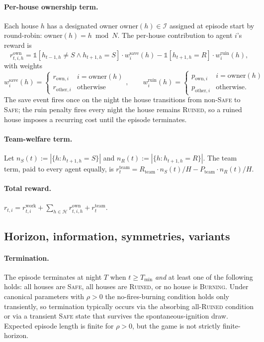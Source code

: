\documentclass{anvil-paper}
\begin{document}
\paragraph{Per-house ownership term.}
Each house $h$ has a designated owner $\mathrm{owner}(h)\in\mathcal{I}$
assigned at episode start by round-robin: $\mathrm{owner}(h)=h\bmod N$.
The per-house contribution to agent $i$'s reward is
\[
  r_{t,i,h}^{\text{own}} = \mathbb{1}[h_{t-1,h}\neq S\land h_{t+1,h}=S]
                           \cdot w^{\text{save}}_i(h)
                         - \mathbb{1}[h_{t+1,h}=R]\cdot w^{\text{ruin}}_i(h),
\]
with weights
\[
  w^{\text{save}}_i(h) = \begin{cases}
    r_{\text{own},i} & i=\mathrm{owner}(h) \\
    r_{\text{other},i} & \text{otherwise}
  \end{cases},\qquad
  w^{\text{ruin}}_i(h) = \begin{cases}
    p_{\text{own},i} & i=\mathrm{owner}(h) \\
    p_{\text{other},i} & \text{otherwise.}
  \end{cases}
\]
The save event fires once on the night the house transitions from
non-\textsc{Safe} to \textsc{Safe}; the ruin penalty fires every night
the house remains \textsc{Ruined}, so a ruined house imposes a recurring
cost until the episode terminates.

\paragraph{Team-welfare term.}
Let $n_S(t):=|\{h:h_{t+1,h}=S\}|$ and $n_R(t):=|\{h:h_{t+1,h}=R\}|$.
The team term, paid to every agent equally, is
$r_t^{\text{team}}=R_{\text{team}}\cdot n_S(t)/H
                  -P_{\text{team}}\cdot n_R(t)/H$.

\paragraph{Total reward.}
$r_{t,i} = r_{t,i}^{\text{work}}
         + \sum_{h\in\mathcal{H}} r_{t,i,h}^{\text{own}}
         + r_t^{\text{team}}$.

\subsection{Horizon, information, symmetries, variants}
\label{app:envspec:variants}

\paragraph{Termination.}
The episode terminates at night $T$ when $t\geq T_{\min}$ \emph{and} at
least one of the following holds: all houses are \textsc{Safe}, all
houses are \textsc{Ruined}, or no house is \textsc{Burning}. Under
canonical parameters with $\rho>0$ the no-fires-burning condition holds
only transiently, so termination typically occurs via the absorbing
all-\textsc{Ruined} condition or via a transient \textsc{Safe} state that
survives the spontaneous-ignition draw. Expected episode length is
finite for $\rho>0$, but the game is not strictly finite-horizon.
\end{document}
